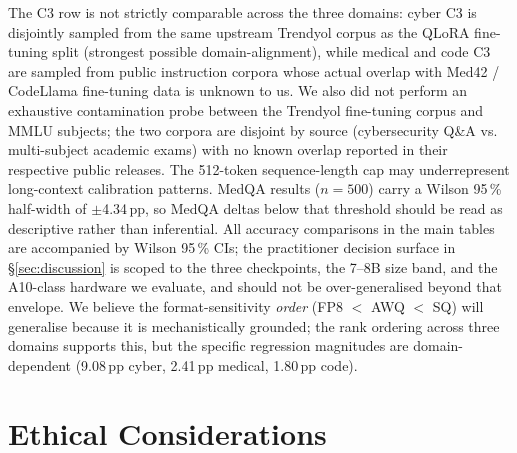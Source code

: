 \documentclass[11pt]{article}
\begin{document}
The C3 row is not strictly comparable across the three domains:
cyber C3 is disjointly sampled from the same upstream Trendyol corpus
as the QLoRA fine-tuning split (strongest possible domain-alignment),
while medical and code C3 are sampled from public instruction corpora
whose actual overlap with Med42 / CodeLlama fine-tuning data is
unknown to us.  We also did not perform an exhaustive contamination
probe between the Trendyol fine-tuning corpus and MMLU subjects; the
two corpora are disjoint by source (cybersecurity Q\&A vs.
multi-subject academic exams) with no known overlap reported in
their respective public releases.  The 512-token sequence-length cap may underrepresent long-context
calibration patterns.  MedQA results ($n=500$) carry a Wilson 95\,\%
half-width of $\pm$4.34\,pp, so MedQA deltas below that threshold
should be read as descriptive rather than inferential.  All accuracy
comparisons in the main tables are accompanied by Wilson 95\,\% CIs;
the practitioner decision surface in \S\ref{sec:discussion} is
scoped to the three checkpoints, the 7--8B size band, and the
A10-class hardware we evaluate, and should not be over-generalised
beyond that envelope.  We believe the format-sensitivity \emph{order}
(FP8 $<$ AWQ $<$ SQ) will generalise because it is mechanistically
grounded; the rank ordering across three domains supports this, but
the specific regression magnitudes are domain-dependent
(9.08\,pp cyber, 2.41\,pp medical, 1.80\,pp code).

\section*{Ethical Considerations}
\end{document}
